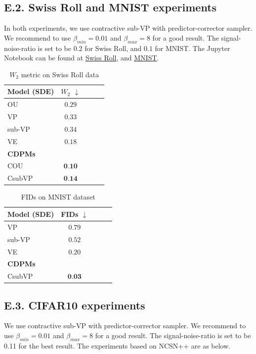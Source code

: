 \documentclass[letterpaper,11pt,reqno]{amsart}
\numberwithin{equation}{section}
\begin{document}
\subsection*{E.2. Swiss Roll and MNIST experiments}
In both experiments, 
we use contractive sub-VP with predictor-corrector sampler. 
We recommend to use $\beta_{min}=0.01$ and $\beta_{max}=8$ for a good result. The signal-noise-ratio is set to be $0.2$ for Swiss Roll,
and $0.1$ for MNIST. 
The Jupyter Notebook can be found at \href{https://colab.research.google.com/drive/1lQhUnIYR9VJIVhlD8t0p73JXKKe6ra09?usp=sharing}{Swiss Roll}, 
and \href{https://colab.research.google.com/drive/1g_sE-E1S8_FVYiqA-VkzFROz4bFXNByZ?usp=sharing}{MNIST}.\\
\begin{table}
\centering
\begin{tabular}{l c c c c}
    \toprule
        Model (SDE) & $W_2$  $\downarrow$\\
        \midrule
        OU ~& $0.29$ \\
        VP~\cite{Song20}& $0.33$\\
        sub-VP~\cite{Song20}& $0.34$\\
        VE~\cite{Song20}& $0.18$\\
        \midrule
        \textbf{CDPMs}\\
        \midrule
         COU & $\textbf{0.10}$\\
         CsubVP & $\textbf{0.14}$\\
         \bottomrule
\end{tabular}
\caption{$W_2$ metric on Swiss Roll data}
\end{table}

\begin{table}
\centering
\begin{tabular}{l c c c c}
    \toprule
        Model (SDE) & FIDs  $\downarrow$\\
        \midrule
        VP~\cite{Song20}& $0.79$\\
        sub-VP~\cite{Song20}& $0.52$\\
        VE~\cite{Song20}& $0.20$\\
        \midrule
        \textbf{CDPMs}\\
        \midrule
         CsubVP & $\textbf{0.03}$\\
         \bottomrule
\end{tabular}
\caption{FIDs on MNIST dataset}
\end{table}

\subsection*{E.3. CIFAR10 experiments}
We use contractive sub-VP with predictor-corrector sampler. 
We recommend to use $\beta_{min}=0.01$ and $\beta_{max}=8$ for a good result.
The signal-noise-ratio is set to be 0.11 for the best result. 
The experiments based on NCSN++ \cite{Song20} are as below.
\end{document}
